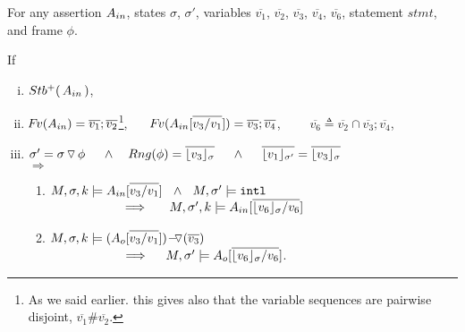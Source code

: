 \begin{lemma}
\label{l:calls}

For any assertion $\Ain$, states $\sigma$, $\sigma'$,  
variables  $\overline{v_1}$,    $\overline{v_2}$,  $\overline{v_3}$,  $\overline{v_4}$,  $\overline{v_6}$,  %
statement $stmt$, and frame $\phi$.

\noindent
If 
\begin{enumerate}[(i)]
\item 
\label{l:calls:r:one}
$ \Pos \Ain$,  
\item 
\label{l:calls:r:two}
$\fv(\Ain) =  \overline{v_1}; \overline{v_2} $\footnote{As we said earlier. this gives  also that the variable sequences  are pairwise disjoint, \ie $\overline{v_1}\#\overline{v_2}$.},
\ \ \ 
$\fv(\Ain[\overline {v_3/v_1}]) =  \overline{v_3}; \overline{v_4} $, \ \ \ \ 
$ \overline {v_6}\triangleq\overline{v_2}\cap\overline{v_3}; \overline{v_4} $, 
\item
$\sigma'=\sigma  \pushSymbol \phi  \ \ \ \  \wedge\ \ \  Rng(\phi)= \overline{\interpret {\sigma} {v_3} }\ \ \ \ \wedge \ \  \ \ \overline {\interpret {\sigma'}  {v_1} } = \overline {\interpret {\sigma} {v_3} }$ 
\\ 
$\Longrightarrow$

\begin{enumerate}
\item
\label{l:calls:callee:one}
$\satDAssertFrom M  \sigma k   \Ain[\overline {v_3/v_1}] %
\ \ \wedge\ \ M, \sigma' \models \intThis  $
 \\ 
$\strut \hspace{2cm}  \hfill \Longrightarrow  \ \ \  \   \ \satDAssertFrom M  {\sigma'} k  {\Ain[\overline { {\interpret {\sigma} {v_6}} / {v_6} } ] }$
\item

\label{l:calls:callee:two}
$\satDAssertFrom M  \sigma k    {\PushASLong  {(\overline {v_3})} {(\Ao[\overline {v_3/v_1}])}}  $ \\ 
$\strut \hspace{2cm}  \hfill \Longrightarrow  \ \ \  \  
M, \sigma' \models   {\Ao[\overline { {\interpret {\sigma} {v_6}} / {v_6} } ] }$.


\end{enumerate}
\end{enumerate}
\end{lemma}
